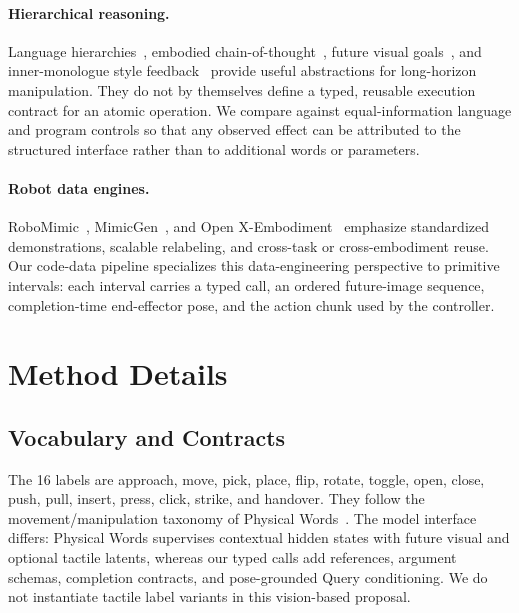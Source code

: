 \paragraph{Hierarchical reasoning.}
Language hierarchies~\cite{rth}, embodied chain-of-thought~\cite{ecot}, future visual goals~\cite{cotvla}, and inner-monologue style feedback~\cite{inner} provide useful abstractions for long-horizon manipulation. They do not by themselves define a typed, reusable execution contract for an atomic operation. We compare against equal-information language and program controls so that any observed effect can be attributed to the structured interface rather than to additional words or parameters.

\paragraph{Robot data engines.}
RoboMimic~\cite{robomimic}, MimicGen~\cite{mimicgen}, and Open X-Embodiment~\cite{oxembodiment} emphasize standardized demonstrations, scalable relabeling, and cross-task or cross-embodiment reuse. Our code-data pipeline specializes this data-engineering perspective to primitive intervals: each interval carries a typed call, an ordered future-image sequence, completion-time end-effector pose, and the action chunk used by the controller.

\section{Method Details}
\setcounter{equation}{0}
\subsection{Vocabulary and Contracts}
\label{app:vocabulary}
The 16 labels are approach, move, pick, place, flip, rotate, toggle, open, close, push, pull, insert, press, click, strike, and handover. They follow the movement/manipulation taxonomy of Physical Words~\cite{physicalwords}.
The model interface differs: Physical Words supervises contextual hidden states with future visual and optional tactile latents, whereas our typed calls add references, argument schemas, completion contracts, and pose-grounded Query conditioning. We do not instantiate tactile label variants in this vision-based proposal.

